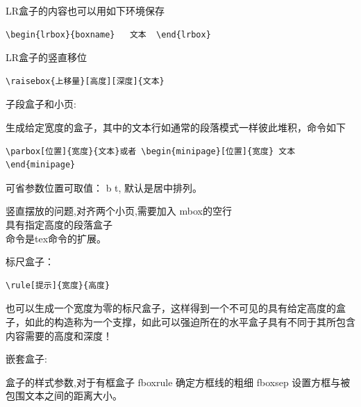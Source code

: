 \documentclass[UTF8]{book}
\newcommand{\kai}{\CJKfamily{kai}}    %
\begin{document}
{LR盒子的内容也可以用如下环境保存
\begin{lstlisting}
\begin{lrbox}{boxname}   文本  \end{lrbox}
\end{lstlisting}

LR盒子的竖直移位
\begin{lstlisting}
\raisebox{上移量}[高度][深度]{文本}
\end{lstlisting}

子段盒子和小页:

生成给定宽度的盒子，其中的文本行如通常的段落模式一样彼此堆积，命令如下
\begin{lstlisting}
\parbox[位置]{宽度}{文本}或者 \begin{minipage}[位置]{宽度} 文本\end{minipage}
\end{lstlisting}
可省参数位置可取值： b t, 默认是居中排列。

竖直摆放的问题,对齐两个小页,需要加入 mbox的空行\\
具有指定高度的段落盒子\\
命令是tex命令的扩展。

标尺盒子：
\begin{lstlisting}
\rule[提示]{宽度}{高度}
\end{lstlisting}
也可以生成一个宽度为零的标尺盒子，这样得到一个不可见的具有给定高度的盒子，如此的构造称为一个支撑，如此可以强迫所在的水平盒子具有不同于其所包含内容需要的高度和深度！

嵌套盒子:

盒子的样式参数,对于有框盒子 fboxrule 确定方框线的粗细  fboxsep  设置方框与被包围文本之间的距离大小。

}
\kai{

}
\end{document}
